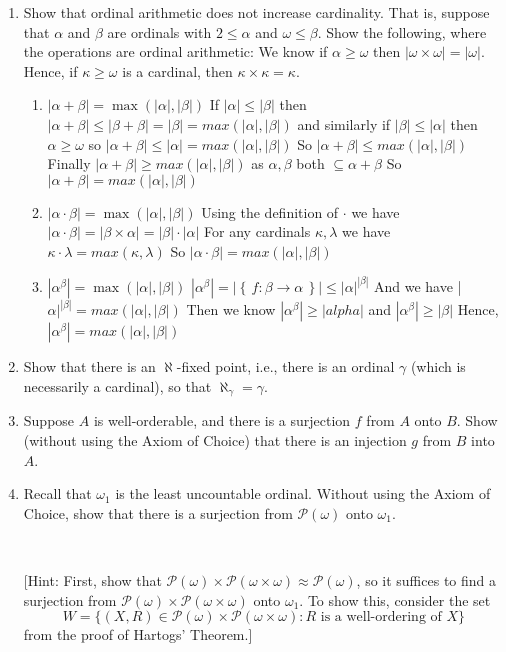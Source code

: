 \documentclass[11pt]{amsart}
\newcommand{\set}[1]{\left\{\,#1\,\right\}}
\begin{document}
\begin{enumerate}
\item Show that ordinal arithmetic does not increase cardinality. That is, suppose that $\alpha$ and $\beta$ are ordinals with $2 \leq \alpha$ and $\omega \leq \beta$. Show the following, where the operations are ordinal arithmetic:
We know if $\alpha \geq \omega$ then $|\omega \times \omega| = |\omega|$.
Hence, if $\kappa \geq \omega$ is a cardinal, then $\kappa \times \kappa = \kappa$.
\ 
\begin{enumerate}
\item $|\alpha + \beta| = \max(|\alpha|, |\beta|)$
If $|\alpha| \leq |\beta|$ then $|\alpha + \beta| \leq |\beta + \beta| = |\beta| = max(|\alpha|,|\beta|)$
and similarly if $|\beta| \leq |\alpha|$ then $\alpha \geq \omega$ so $|\alpha + \beta| \leq |\alpha| = max(|\alpha|,|\beta|)$
So $|\alpha + \beta| \leq max(|\alpha|,|\beta|)$
Finally $|\alpha + \beta| \geq max(|\alpha|,|\beta|)$ as $\alpha, \beta$ both $\subseteq \alpha + \beta$
So $|\alpha + \beta| = max(|\alpha|,|\beta|)$
\vfill
\item $|\alpha \cdot \beta| = \max(|\alpha|, |\beta|)$
Using the definition of $\cdot$ we have $|\alpha \cdot \beta| = |\beta \times \alpha| = |\beta| \cdot |\alpha|$
For any cardinals $\kappa, \lambda$ we have $\kappa \cdot \lambda = max(\kappa,\lambda)$
So $|\alpha \cdot \beta| = max(|\alpha|,|\beta|)$
\vfill
\item $|\alpha^\beta| = \max(|\alpha|, |\beta|)$
$|\alpha^\beta| = |\set{f : \beta \rightarrow \alpha}| \leq |\alpha|^{|\beta|}$
And we have |$\alpha|^{|\beta|} = max(|\alpha|,|\beta|)$
Then we know $|\alpha^\beta| \geq |alpha|$ and $|\alpha^\beta| \geq |\beta|$
Hence, $|\alpha^\beta| = max(|\alpha|,|\beta|)$
\vfill
\end{enumerate}

\newpage

\item Show that there is an $\aleph$-fixed point, i.e., there is an ordinal $\gamma$ (which is necessarily a cardinal), so that $\aleph_{\gamma} = \gamma$.

\newpage

\item  Suppose $A$ is well-orderable, and there is a surjection $f$ from $A$ onto $B$. Show (without using the Axiom of Choice) that there is an injection $g$ from $B$ into $A$.

\newpage

\item Recall that $\omega_1$ is the least uncountable ordinal. Without using the Axiom of Choice, show that there is a surjection from $\mathcal{P}(\omega)$ onto $\omega_1$.

\ 

\noindent
{\small [Hint: First, show that $\mathcal{P}(\omega) \times \mathcal{P}(\omega \times \omega) \approx \mathcal{P}(\omega)$, so it suffices to find a surjection from $\mathcal{P}(\omega) \times \mathcal{P}(\omega \times \omega)$ onto $\omega_1$. To show this, consider the set
\[ W= \{ (X,R) \in \mathcal{P}(\omega) \times \mathcal{P}(\omega \times \omega) : \text{$R$ is a well-ordering of $X$} \} \]
from the proof of Hartogs' Theorem.] }


\end{enumerate}
\end{document}
